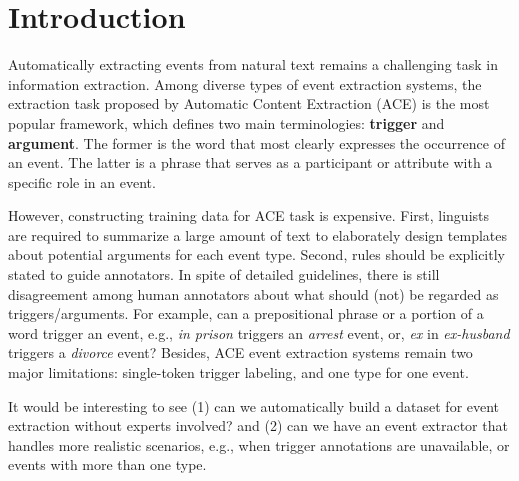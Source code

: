\section{Introduction}
Automatically extracting events from natural text remains a challenging task in information extraction. Among diverse types of event extraction systems, the extraction task proposed by Automatic Content Extraction (ACE) \cite{doddington2004automatic} is the most popular framework, which defines two main terminologies: \textbf{trigger} and \textbf{argument}. The former is the word that most clearly expresses the occurrence of an event. The latter is a phrase that serves as a participant or attribute with a specific role in an event.

However, constructing training data for ACE task is expensive. First, linguists are required to summarize a large amount of text to elaborately design templates about potential arguments for each event type. Second, rules should be explicitly stated to guide annotators. In spite of detailed guidelines, there is still disagreement among human annotators about what should (not) be regarded as triggers/arguments. 
For example, can a prepositional phrase or a portion of a word trigger an event, e.g.,  \textit{in prison} triggers an \emph{arrest} event, 
or, \textit{ex} in \textit{ex-husband} triggers a \emph{divorce} event?
Besides, ACE event extraction systems remain two major limitations:   single-token trigger labeling, and one type for one event.

It would be interesting to see (1) can we automatically build a dataset for event extraction without experts involved? 
and (2) can we have an event extractor that handles more realistic scenarios, e.g.,  when trigger annotations are unavailable, or events with more than one type.

